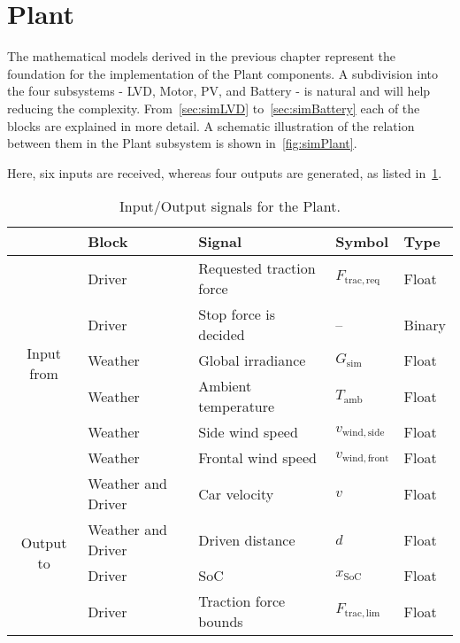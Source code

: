 \section{Plant}
\label{sec:simPlant}
The mathematical models derived in the previous chapter represent the foundation for the implementation of the Plant components. A subdivision into the four subsystems - LVD, Motor, PV, and Battery - is natural and will help reducing the complexity. From~\cref{sec:simLVD} to~\cref{sec:simBattery} each of the blocks are explained in more detail. A schematic illustration of the relation between them in the Plant subsystem is shown in~\cref{fig:simPlant}. 
\begin{sidewaysfigure}[htbp]
	\centering
	
	\caption{Block diagram representation for the Plant.}
	\label{fig:simPlant}
\end{sidewaysfigure}
Here, six inputs are received, whereas four outputs are generated, as listed in~\cref{tab:simInOutPlant}.
\begin{table}[htbp]
	\centering
	\caption{Input/Output signals for the Plant.}
	\label{tab:simInOutPlant}
	
	\begin{tabular}{c l l l l}
		\toprule
		& Block & Signal & Symbol & Type \\ 
		\midrule
		\multirow{6}{*}{Input from}
		& Driver & Requested traction force & $F_\mathrm{trac,req}$ & Float \\
		& Driver & Stop force is decided & -- & Binary \\
		& Weather & Global irradiance & $G_\mathrm{sim}$ & Float \\
		& Weather & Ambient temperature & $T_\mathrm{amb}$ & Float \\
		& Weather & Side wind speed & $v_\mathrm{wind,side}$ & Float \\
		& Weather & Frontal wind speed & $v_\mathrm{wind,front}$ & Float \\

		\midrule
		\multirow{4}{*}{Output to}
		& Weather and Driver & Car velocity & $v$ & Float \\
		& Weather and Driver & Driven distance & $d$ & Float \\
		& Driver & SoC & $x_\mathrm{SoC}$ & Float \\
		& Driver & Traction force bounds & $F_\mathrm{trac,lim}$ & Float \\
		\bottomrule
	\end{tabular}
\end{table}


